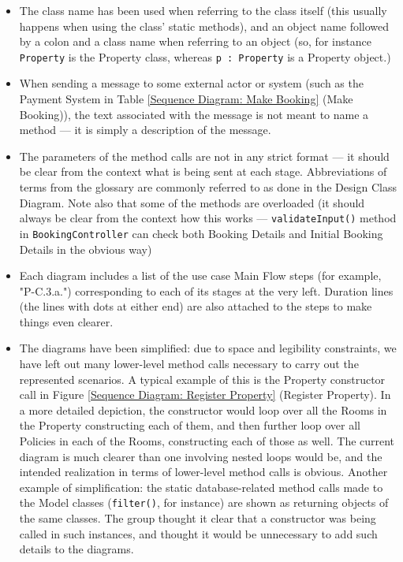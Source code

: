 \begin{itemize}
    \item The class name has been used when referring to the class itself (this usually happens when using the class' static methods), and an object name followed by a colon and a class name when referring to an object (so, for instance \texttt{Property} is the Property class, whereas \texttt{p : Property} is a Property object.)
    \item When sending a message to some external actor or system (such as the Payment System in Table \ref{Sequence Diagram: Make Booking} (Make Booking)), the text associated with the message is not meant to name a method --- it is simply a description of the message.
    \item The parameters of the method calls are not in any strict format --- it should be clear from the context what is being sent at each stage. Abbreviations of terms from the glossary are commonly referred to as done in the Design Class Diagram. Note also that some of the methods are overloaded (it should always be clear from the context how this works --- \texttt{validateInput()} method in \texttt{BookingController} can check both Booking Details and Initial Booking Details in the obvious way)
    \item Each diagram includes a list of the use case Main Flow steps (for example, "P-C.3.a.") corresponding to each of its stages at the very left. Duration lines (the lines with dots at either end) are also attached to the steps to make things even clearer.
    \item The diagrams have been simplified: due to space and legibility constraints, we have left out many lower-level method calls necessary to carry out the represented scenarios. A typical example of this is the Property constructor call in Figure \ref{Sequence Diagram: Register Property} (Register Property). In a more detailed depiction, the constructor would loop over all the Rooms in the Property constructing each of them, and then further loop over all Policies in each of the Rooms, constructing each of those as well. The current diagram is much clearer than one involving nested loops would be, and the intended realization in terms of lower-level method calls is obvious. Another example of simplification: the static database-related method calls made to the Model classes (\texttt{filter()}, for instance) are shown as returning objects of the same classes. The group thought it clear that a constructor was being called in such instances, and thought it would be unnecessary to add such details to the diagrams.

\end{itemize}

